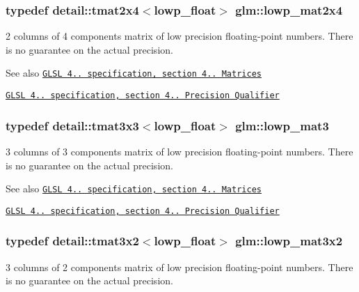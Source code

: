 \subsubsection[{lowp\+\_\+mat2x4}]{\setlength{\rightskip}{0pt plus 5cm}typedef detail\+::tmat2x4$<$lowp\+\_\+float$>$ {\bf glm\+::lowp\+\_\+mat2x4}}\label{group__core__precision_ga800238e68eee3279c7a38d4f3cd005e8}
2 columns of 4 components matrix of low precision floating-\/point numbers. There is no guarantee on the actual precision.

\begin{DoxySeeAlso}{See also}
\href{http://www.opengl.org/registry/doc/GLSLangSpec.4.20.8.pdf}{\tt G\+L\+S\+L 4.. specification, section 4.. Matrices} 

\href{http://www.opengl.org/registry/doc/GLSLangSpec.4.20.8.pdf}{\tt G\+L\+S\+L 4.. specification, section 4.. Precision Qualifier} 
\end{DoxySeeAlso}
\hypertarget{group__core__precision_gaf32a06a88eff09262459a4448abea9ad}{}
\subsubsection[{lowp\+\_\+mat3}]{\setlength{\rightskip}{0pt plus 5cm}typedef detail\+::tmat3x3$<$lowp\+\_\+float$>$ {\bf glm\+::lowp\+\_\+mat3}}\label{group__core__precision_gaf32a06a88eff09262459a4448abea9ad}
3 columns of 3 components matrix of low precision floating-\/point numbers. There is no guarantee on the actual precision.

\begin{DoxySeeAlso}{See also}
\href{http://www.opengl.org/registry/doc/GLSLangSpec.4.20.8.pdf}{\tt G\+L\+S\+L 4.. specification, section 4.. Matrices} 

\href{http://www.opengl.org/registry/doc/GLSLangSpec.4.20.8.pdf}{\tt G\+L\+S\+L 4.. specification, section 4.. Precision Qualifier} 
\end{DoxySeeAlso}
\hypertarget{group__core__precision_ga590ba3600da3c6dc36a0eb7574cbd6f6}{}
\subsubsection[{lowp\+\_\+mat3x2}]{\setlength{\rightskip}{0pt plus 5cm}typedef detail\+::tmat3x2$<$lowp\+\_\+float$>$ {\bf glm\+::lowp\+\_\+mat3x2}}\label{group__core__precision_ga590ba3600da3c6dc36a0eb7574cbd6f6}
3 columns of 2 components matrix of low precision floating-\/point numbers. There is no guarantee on the actual precision.

